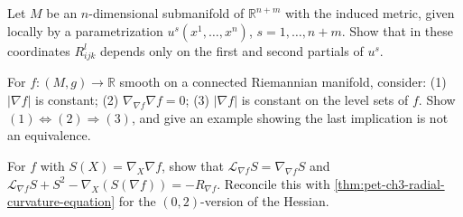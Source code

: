 \begin{remark}[Exercise 3.4.1]
  \label{rem:pet-ch3-ex-1}
  \leanok
  Let $M$ be an $n$-dimensional submanifold of $\mathbb R^{n+m}$ with the induced
  metric, given locally by a parametrization $u^s(x^1,\dots,x^n)$,
  $s=1,\dots,n+m$. Show that in these coordinates $R^l_{ijk}$ depends only on the
  first and second partials of $u^s$.
\end{remark}

\begin{remark}[Exercise 3.4.2]
  \label{rem:pet-ch3-ex-2}
  \leanok
  For $f:(M,g)\to\mathbb R$ smooth on a connected Riemannian manifold, consider:
  (1) $|\nabla f|$ is constant; (2) $\nabla_{\nabla f}\nabla f=0$; (3) $|\nabla
  f|$ is constant on the level sets of $f$. Show $(1)\Leftrightarrow(2)\Rightarrow(3)$,
  and give an example showing the last implication is not an equivalence.
\end{remark}

\begin{remark}[Exercise 3.4.3]
  \label{rem:pet-ch3-ex-3}
  \leanok
  For $f$ with $S(X)=\nabla_X\nabla f$, show that
  $\mathcal L_{\nabla f}S=\nabla_{\nabla f}S$ and
  $\mathcal L_{\nabla f}S+S^2-\nabla_X(S(\nabla f))=-R_{\nabla f}$. Reconcile this
  with \cref{thm:pet-ch3-radial-curvature-equation} for the $(0,2)$-version of
  the Hessian.
\end{remark}


